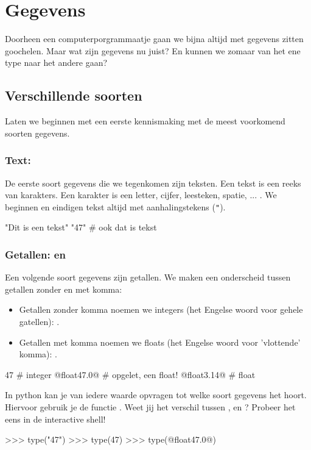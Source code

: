 \section{Gegevens}

Doorheen een computerporgrammaatje gaan we bijna altijd met gegevens zitten goochelen.
Maar wat zijn gegevens nu juist?
En kunnen we zomaar van het ene type naar het andere gaan?

\subsection{Verschillende soorten}

Laten we beginnen met een eerste kennismaking met de meest voorkomend soorten gegevens.

\subsubsection{Text: \stringtype}

De eerste soort gegevens die we tegenkomen zijn teksten.
Een tekst is een reeks van karakters.
Een karakter is een letter, cijfer, leesteken, spatie, ... .
We beginnen en eindigen tekst altijd met aanhalingstekens (\verb|"|).
\begin{pyEnv}
"Dit is een tekst"
"47"                        # ook dat is tekst
\end{pyEnv}

\subsubsection{Getallen: \integertype en \floattype}

Een volgende soort gegevens zijn getallen.
We maken een onderscheid tussen getallen zonder en met komma:
\begin{itemize}
\item Getallen zonder komma noemen we integers (het Engelse woord voor gehele gatellen): \integertype.
\item Getallen met komma noemen we floats (het Engelse woord voor 'vlottende' komma): \floattype.
\end{itemize}
\begin{pyEnv}
47                          # integer
@float47.0@                        # opgelet, een float!
@float3.14@                        # float
\end{pyEnv}

\begin{letsTryOut}
	In python kan je van iedere waarde opvragen tot welke soort gegevens het hoort.
	Hiervoor gebruik je de functie .
	\newline
	Weet jij het verschil tussen ,  en ?
	\newline
	Probeer het eens in de interactive shell!
\begin{pyEnv}
>>> type("47")
>>> type(47)
>>> type(@float47.0@)
\end{pyEnv}
\end{letsTryOut}

